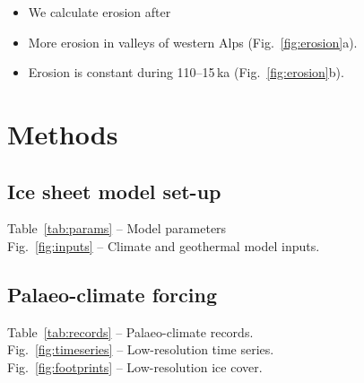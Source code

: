 \documentclass{article}
\begin{document}
    \begin{itemize}
    \item We calculate erosion after \citet{Herman.etal.2015}
    \item More erosion in valleys of western Alps (Fig.~\ref{fig:erosion}a).
    \item Erosion is constant during 110--15\,ka (Fig.~\ref{fig:erosion}b).
    \end{itemize}

\section{Methods}

\subsection{Ice sheet model set-up}
    Table~\ref{tab:params} -- Model parameters\\
    Fig.~\ref{fig:inputs} -- Climate and geothermal model inputs.\\
\subsection{Palaeo-climate forcing}
    Table~\ref{tab:records} -- Palaeo-climate records.\\
    Fig.~\ref{fig:timeseries} -- Low-resolution time series.\\
    Fig.~\ref{fig:footprints} -- Low-resolution ice cover.





\clearpage
\end{document}
